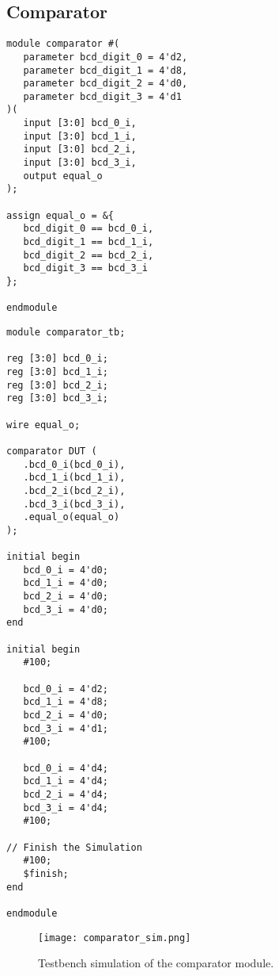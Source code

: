 \subsection{Comparator}

\begin{verbatim}
module comparator #(
   parameter bcd_digit_0 = 4'd2,
   parameter bcd_digit_1 = 4'd8,
   parameter bcd_digit_2 = 4'd0,
   parameter bcd_digit_3 = 4'd1
)(
   input [3:0] bcd_0_i,
   input [3:0] bcd_1_i,
   input [3:0] bcd_2_i,
   input [3:0] bcd_3_i,
   output equal_o
);

assign equal_o = &{
   bcd_digit_0 == bcd_0_i,
   bcd_digit_1 == bcd_1_i,
   bcd_digit_2 == bcd_2_i,
   bcd_digit_3 == bcd_3_i
};

endmodule
\end{verbatim}

\begin{verbatim}
module comparator_tb;

reg [3:0] bcd_0_i;
reg [3:0] bcd_1_i;
reg [3:0] bcd_2_i;
reg [3:0] bcd_3_i;

wire equal_o;

comparator DUT (
   .bcd_0_i(bcd_0_i),
   .bcd_1_i(bcd_1_i),
   .bcd_2_i(bcd_2_i),
   .bcd_3_i(bcd_3_i),
   .equal_o(equal_o)
);

initial begin
   bcd_0_i = 4'd0;
   bcd_1_i = 4'd0;
   bcd_2_i = 4'd0;
   bcd_3_i = 4'd0;
end

initial begin
   #100;

   bcd_0_i = 4'd2;
   bcd_1_i = 4'd8;
   bcd_2_i = 4'd0;
   bcd_3_i = 4'd1;
   #100;

   bcd_0_i = 4'd4;
   bcd_1_i = 4'd4;
   bcd_2_i = 4'd4;
   bcd_3_i = 4'd4;
   #100;

// Finish the Simulation
   #100;
   $finish;
end

endmodule
\end{verbatim}

\begin{figure}[htbp]
   \centering
   \texttt{[image: comparator\_sim.png]}
   \caption{Testbench simulation of the comparator module.}
   \label{fig:comparator_sim}
\end{figure}
